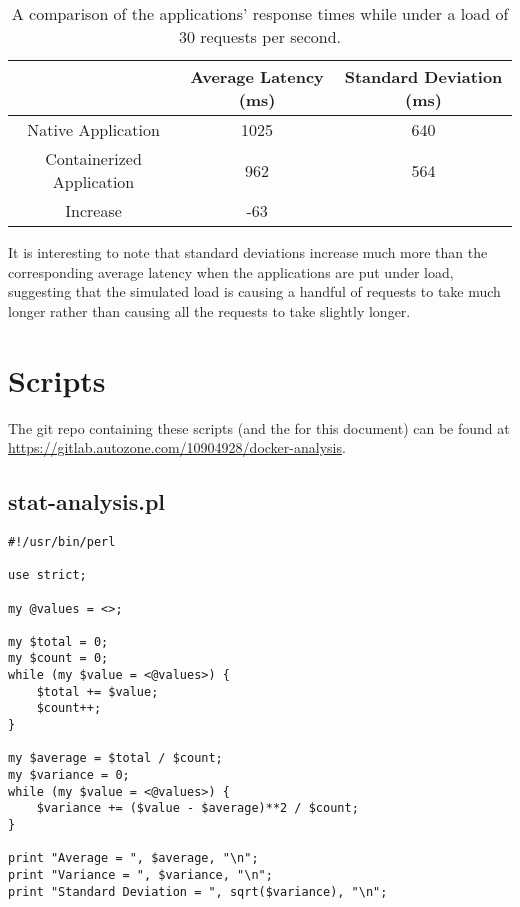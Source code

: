 \documentclass{article}
\begin{document}
\begin{table}[H]
\begin{tabular}{ |c|c|c| }
 \hline
 & Average Latency (ms) & Standard Deviation (ms) \\
 \hline
 Native Application & 1025 & 640 \\
 \hline
 Containerized Application & 962 & 564 \\
 \hline\hline
 Increase & -63 & \\
 \hline
\end{tabular}
\caption{A comparison of the applications' response times while under a load of 30 requests per second.}
\label{latency-under-load-30}
\end{table}

It is interesting to note that standard deviations increase much more than the corresponding average latency when the applications are put under load, suggesting that the simulated load is causing a handful of requests to take much longer rather than causing all the requests to take slightly longer.

\section{Scripts}
The git repo containing these scripts (and the \latex for this document) can be found at \href{https://gitlab.autozone.com/10904928/docker-analysis}{https://gitlab.autozone.com/10904928/docker-analysis}.

\subsection{stat-analysis.pl}
\begin{verbatim}
#!/usr/bin/perl

use strict;

my @values = <>;

my $total = 0;
my $count = 0;
while (my $value = <@values>) {
    $total += $value;
    $count++;
}

my $average = $total / $count;
my $variance = 0;
while (my $value = <@values>) {
    $variance += ($value - $average)**2 / $count;
}

print "Average = ", $average, "\n";
print "Variance = ", $variance, "\n";
print "Standard Deviation = ", sqrt($variance), "\n";
\end{verbatim}
\end{document}
